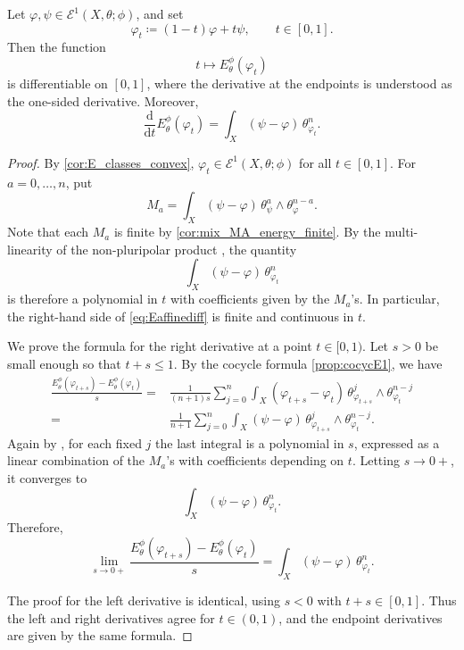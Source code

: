 \begin{lemma}\label{lma:Eaffinediff}
    Let $\varphi,\psi\in \mathcal{E}^{1}(X,\theta;\phi)$, and set
    \[
        \varphi_t\coloneqq (1-t)\varphi+t\psi,\qquad t\in[0,1].
    \]
    Then the function
    \[
        t\mapsto E_{\theta}^{\phi}(\varphi_t)
    \]
    is differentiable on $[0,1]$, where the derivative at the endpoints is understood as the one-sided derivative. Moreover,
    \begin{equation}\label{eq:Eaffinediff}
        \frac{\mathrm d}{\mathrm dt}E_{\theta}^{\phi}(\varphi_t)
        =
        \int_X(\psi-\varphi)\,\theta_{\varphi_t}^n.
    \end{equation}
\end{lemma}
\begin{proof}
    By \cref{cor:E_classes_convex}, $\varphi_t\in \mathcal E^1(X,\theta;\phi)$ for all $t\in[0,1]$.
    For $a=0,\ldots,n$, put
    \[
        M_a=\int_X(\psi-\varphi)\,\theta_{\psi}^a\wedge\theta_{\varphi}^{n-a}.
    \]
    Note that each $M_a$ is finite by \cref{cor:mix_MA_energy_finite}. By the multi-linearity of the non-pluripolar product , the quantity
    \[
        \int_X(\psi-\varphi)\,\theta_{\varphi_t}^n
    \]
    is therefore a polynomial in $t$ with coefficients given by the $M_a$'s. In particular, the right-hand side of \eqref{eq:Eaffinediff} is finite and continuous in $t$.

    We prove the formula for the right derivative at a point $t\in[0,1)$. Let $s>0$ be small enough so that $t+s\leq 1$. By the cocycle formula \cref{prop:cocycE1}, we have
    \[
    \begin{aligned}
        \frac{E_{\theta}^{\phi}(\varphi_{t+s})-E_{\theta}^{\phi}(\varphi_t)}{s}
        =&\frac{1}{(n+1)s}\sum_{j=0}^n
        \int_X(\varphi_{t+s}-\varphi_t)\,
        \theta_{\varphi_{t+s}}^j\wedge\theta_{\varphi_t}^{n-j} \\
        =&\frac{1}{n+1}\sum_{j=0}^n
        \int_X(\psi-\varphi)\,
        \theta_{\varphi_{t+s}}^j\wedge\theta_{\varphi_t}^{n-j}.
    \end{aligned}
    \]
    Again by , for each fixed $j$ the last integral is a polynomial in $s$, expressed as a linear combination of the $M_a$'s with coefficients depending on $t$. Letting $s\to 0+$, it converges to
    \[
        \int_X(\psi-\varphi)\,\theta_{\varphi_t}^n.
    \]
    Therefore,
    \[
        \lim_{s\to0+}
        \frac{E_{\theta}^{\phi}(\varphi_{t+s})-E_{\theta}^{\phi}(\varphi_t)}{s}
        =
        \int_X(\psi-\varphi)\,\theta_{\varphi_t}^n.
    \]

    The proof for the left derivative is identical, using $s<0$ with $t+s\in[0,1]$. Thus the left and right derivatives agree for $t\in(0,1)$, and the endpoint derivatives are given by the same formula.
\end{proof}

